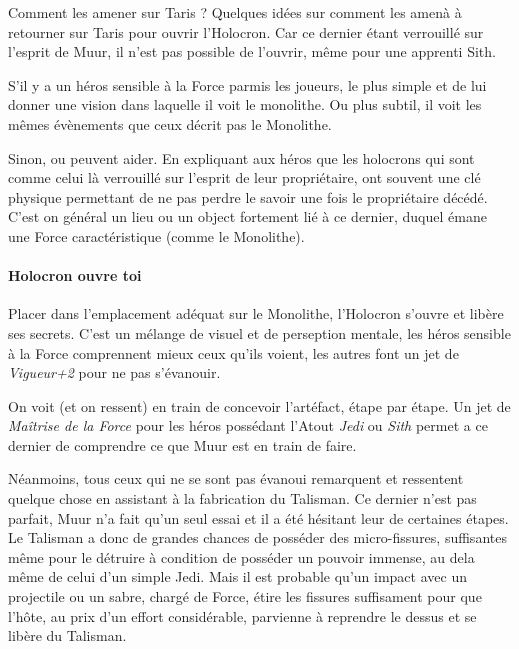 \newpage
\begin{paperbox}{Comment les amener sur Taris ?}
Quelques idées sur comment les amenà à retourner sur Taris pour ouvrir l’Holocron. Car ce dernier étant verrouillé sur l’esprit de Muur, il n’est pas possible de l’ouvrir, même pour une apprenti Sith.

    \begin{rebelist}
        \item S’il y a un héros sensible à la Force parmis les joueurs, le plus simple et de lui donner une vision dans laquelle il voit le monolithe. Ou plus subtil, il voit les mêmes évènements que ceux décrit pas le Monolithe.
        \item Sinon,  ou  peuvent aider. En expliquant aux héros que les holocrons qui sont comme celui là verrouillé sur l’esprit de leur propriétaire, ont souvent une clé physique permettant de ne pas perdre le savoir une fois le propriétaire décédé. C’est on général un lieu ou un object fortement lié à ce dernier, duquel émane une Force caractéristique (comme le Monolithe).
    \end{rebelist}
\end{paperbox}

\paragraph{Holocron ouvre toi}
Placer dans l’emplacement adéquat sur le Monolithe, l’Holocron s’ouvre et libère ses secrets. C’est un mélange de visuel et de perseption mentale, les héros sensible à la Force comprennent mieux ceux qu’ils voient, les autres font un jet de \textit{Vigueur+2} pour ne pas s’évanouir.

On voit (et on ressent)  en train de concevoir l’artéfact, étape par étape. Un jet de \textit{Maîtrise de la Force} pour les héros possédant l'Atout \textit{Jedi} ou \textit{Sith} permet a ce dernier de comprendre ce que Muur est en train de faire.

Néanmoins, tous ceux qui ne se sont pas évanoui remarquent et ressentent quelque chose en assistant à la fabrication du Talisman. Ce dernier n’est pas parfait, Muur n’a fait qu’un seul essai et il a été hésitant leur de certaines étapes. Le Talisman a donc de grandes chances de posséder des micro-fissures, suffisantes même pour le détruire à condition de posséder un pouvoir immense, au dela même de celui d’un simple Jedi. Mais il est probable qu’un impact avec un projectile ou un sabre, chargé de Force, étire les fissures suffisament pour que l’hôte, au prix d’un effort considérable, parvienne à reprendre le dessus et se libère du Talisman. 

